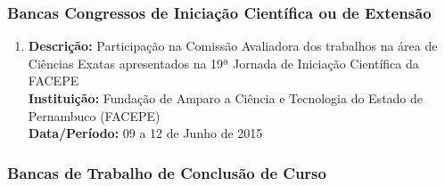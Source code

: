 \documentclass[a4paper,oneside,10pt]{article}
\begin{document}

\subsubsection{Bancas Congressos de Inicia\c{c}\~{a}o Cient\'{i}fica ou de Extens\~{a}o}
\vspace{0.3cm}

\begin{enumerate}
\renewcommand{\labelenumi}{{\large\bfseries\arabic{enumi}.}}
\vspace{0.3cm}

\item       \textbf{Descrição:} Participação na Comissão Avaliadora dos trabalhos na área de Ciências Exatas apresentados na 19ª Jornada de Iniciação Científica da FACEPE \mbox{} \\
            \textbf{Instituição:} Fundação de Amparo a Ciência e Tecnologia do Estado de Pernambuco (FACEPE) \\
            \textbf{Data/Período:} 09 a 12 de Junho de 2015

\end{enumerate}


\subsubsection{Bancas de Trabalho de Conclus\~{a}o de Curso}
\vspace{0.3cm}
\end{document}
